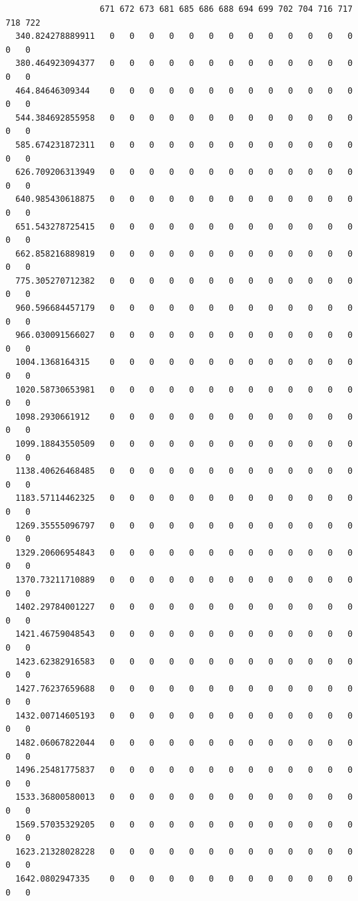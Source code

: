 \documentclass[
  letterpaper,
  DIV=11,
  numbers=noendperiod]{scrartcl}
\begin{document}
\begin{verbatim}
                   671 672 673 681 685 686 688 694 699 702 704 716 717 718 722
  340.824278889911   0   0   0   0   0   0   0   0   0   0   0   0   0   0   0
  380.464923094377   0   0   0   0   0   0   0   0   0   0   0   0   0   0   0
  464.84646309344    0   0   0   0   0   0   0   0   0   0   0   0   0   0   0
  544.384692855958   0   0   0   0   0   0   0   0   0   0   0   0   0   0   0
  585.674231872311   0   0   0   0   0   0   0   0   0   0   0   0   0   0   0
  626.709206313949   0   0   0   0   0   0   0   0   0   0   0   0   0   0   0
  640.985430618875   0   0   0   0   0   0   0   0   0   0   0   0   0   0   0
  651.543278725415   0   0   0   0   0   0   0   0   0   0   0   0   0   0   0
  662.858216889819   0   0   0   0   0   0   0   0   0   0   0   0   0   0   0
  775.305270712382   0   0   0   0   0   0   0   0   0   0   0   0   0   0   0
  960.596684457179   0   0   0   0   0   0   0   0   0   0   0   0   0   0   0
  966.030091566027   0   0   0   0   0   0   0   0   0   0   0   0   0   0   0
  1004.1368164315    0   0   0   0   0   0   0   0   0   0   0   0   0   0   0
  1020.58730653981   0   0   0   0   0   0   0   0   0   0   0   0   0   0   0
  1098.2930661912    0   0   0   0   0   0   0   0   0   0   0   0   0   0   0
  1099.18843550509   0   0   0   0   0   0   0   0   0   0   0   0   0   0   0
  1138.40626468485   0   0   0   0   0   0   0   0   0   0   0   0   0   0   0
  1183.57114462325   0   0   0   0   0   0   0   0   0   0   0   0   0   0   0
  1269.35555096797   0   0   0   0   0   0   0   0   0   0   0   0   0   0   0
  1329.20606954843   0   0   0   0   0   0   0   0   0   0   0   0   0   0   0
  1370.73211710889   0   0   0   0   0   0   0   0   0   0   0   0   0   0   0
  1402.29784001227   0   0   0   0   0   0   0   0   0   0   0   0   0   0   0
  1421.46759048543   0   0   0   0   0   0   0   0   0   0   0   0   0   0   0
  1423.62382916583   0   0   0   0   0   0   0   0   0   0   0   0   0   0   0
  1427.76237659688   0   0   0   0   0   0   0   0   0   0   0   0   0   0   0
  1432.00714605193   0   0   0   0   0   0   0   0   0   0   0   0   0   0   0
  1482.06067822044   0   0   0   0   0   0   0   0   0   0   0   0   0   0   0
  1496.25481775837   0   0   0   0   0   0   0   0   0   0   0   0   0   0   0
  1533.36800580013   0   0   0   0   0   0   0   0   0   0   0   0   0   0   0
  1569.57035329205   0   0   0   0   0   0   0   0   0   0   0   0   0   0   0
  1623.21328028228   0   0   0   0   0   0   0   0   0   0   0   0   0   0   0
  1642.0802947335    0   0   0   0   0   0   0   0   0   0   0   0   0   0   0

\end{verbatim}
\end{document}
